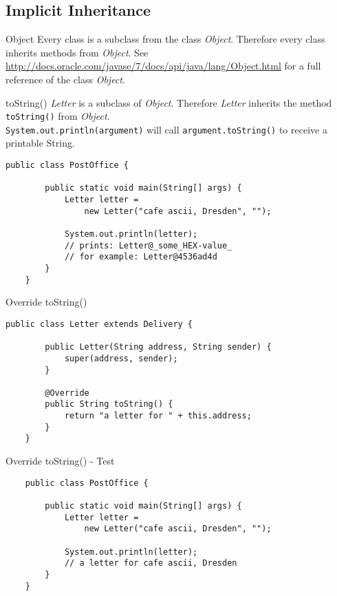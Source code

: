 \subsection{Implicit Inheritance}
\begin{frame}{Object}
    Every class is a subclass from the class \emph{Object}. 
    Therefore every class inherits methods from \emph{Object}.
    \vfill
    See \scriptsize\url{http://docs.oracle.com/javase/7/docs/api/java/lang/Object.html} \normalsize for
    a full reference of the class \emph{Object}.
\end{frame}

\begin{frame}[fragile]{toString()}
    \emph{Letter} is a subclass of \emph{Object}.
    Therefore \emph{Letter} inherits the method \texttt{toString()} from \emph{Object}.\\
    \texttt{System.out.println(argument)} will call \texttt{argument.toString()} to receive
    a printable String.
    \begin{lstlisting}[escapechar=!]
    public class PostOffice {
        
        public static void main(String[] args) {        
            Letter letter = 
                new Letter("cafe ascii, Dresden", "");
            
            System.out.println(letter);
            // prints: Letter@_some_HEX-value_
            // for example: Letter@4536ad4d
        }
    }\end{lstlisting}
\end{frame}

\begin{frame}[fragile]{Override toString()}
    \begin{lstlisting}[escapechar=!]
    public class Letter extends Delivery {

        public Letter(String address, String sender) {
            super(address, sender);
        }
    
        @Override
        public String toString() {
            return "a letter for " + this.address;
        }    
    } \end{lstlisting}
\end{frame}

\begin{frame}[fragile]{Override toString() - Test}
    \begin{lstlisting}
    public class PostOffice {
        
        public static void main(String[] args) {        
            Letter letter = 
                new Letter("cafe ascii, Dresden", "");
            
            System.out.println(letter);
            // a letter for cafe ascii, Dresden
        }
    } \end{lstlisting}
\end{frame}

